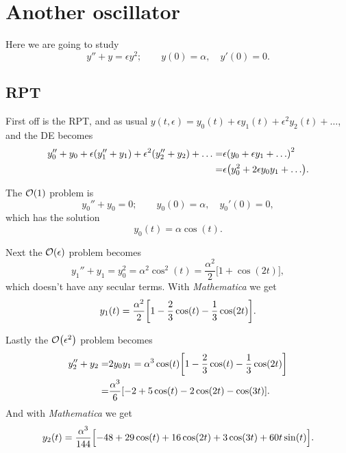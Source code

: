 \documentclass[11pt,letter, swedish, english
]{article}
\renewcommand{\thesubsection}{\arabic{section} (\alph{subsection})}
\begin{document}
\section{Another oscillator}
\renewcommand{\thesubsection}{\arabic{section} (\alph{subsection})}
Here we are going to study
\begin{equation}
y''+y=\epsilon y^2;\qquad
y(0)=\alpha,\quad y'(0)=0.
\end{equation}

\subsection{RPT}
First off is the RPT, and as usual 
$y(t,\epsilon)=y_0(t)+\epsilon y_1(t)+\epsilon^2y_2(t)+\ldots$, and
the DE becomes
\begin{equation}
\begin{aligned}
y_0''+y_0+\epsilon\qty(y_1''+y_1)+\epsilon^2\qty(y_2''+y_2)
+\ldots=&\epsilon\qty(y_0+\epsilon y_1+\ldots)^2\\
=&\epsilon\qty(y_0^2+2\epsilon y_0y_1+\ldots).
\end{aligned}
\end{equation}

The $\order{1}$ problem is 
\begin{equation}
y_0''+y_0=0;\qquad
y_0(0)=\alpha,\quad {y_0'}(0)=0,
\end{equation}
which has the solution
\begin{equation}
y_0(t)=\alpha\cos(t).
\end{equation}

Next the $\order{\epsilon}$ problem becomes
\begin{equation}
y_1''+y_1=y_0^2=\alpha^2\cos^2(t)=
\frac{\alpha^2}{2}\Big[1+\cos(2t)\Big],
\end{equation}
which doesn't have any secular terms. With
\textit{Mathematica}\footnotemark{} we get 
\begin{equation}
y_1(t)=\frac{\alpha^2}{2}
\qty[1-\frac{2}{3}\cos(t)-\frac{1}{3}\cos(2t)].
\end{equation}


Lastly the $\order{\epsilon^2}$ problem becomes
\begin{equation}
\begin{aligned}
y_2''+y_2=&2y_0y_1=\alpha^3\cos(t)\qty[1-\frac{2}{3}\cos(t)-\frac{1}{3}\cos(2t)]
\\=&\frac{\alpha^3}{6}\qty[-2+5\cos(t)-2\cos(2t)-\cos(3t)].
\end{aligned}
\end{equation}
And with \textit{Mathematica} we get
\begin{equation}
y_2(t)=\frac{\alpha^3}{144}
\qty[-48+29\cos(t)+16\cos(2t)+3\cos(3t)+60t\sin(t)\Big.].
\end{equation}
\end{document}
